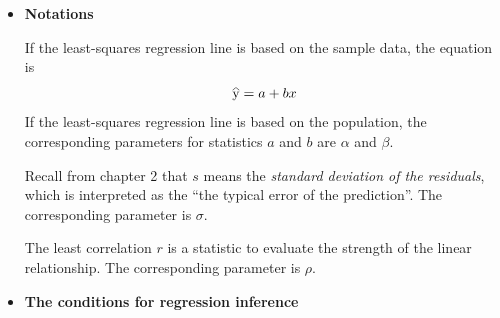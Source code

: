 \documentclass[a4paper, 12pt,twoside]{book}
\newcommand\reallywidehat[1]{%
\savestack{\tmpbox}{\stretchto{%
  \scaleto{%
    \scalerel*[\widthof{\ensuremath{#1}}]{\kern-.6pt\bigwedge\kern-.6pt}%
    {\rule[-\textheight/2]{1ex}{\textheight}}%
  }{\textheight}%
}{0.5ex}}%
\stackon[1pt]{#1}{\tmpbox}%
}
\begin{document}
\begin{itemize}
   \item \textbf{Notations}\vspace{0.3cm}
   
   If the least-squares regression line is based on the sample data, the equation is 
   $$\reallywidehat{y} = a + bx$$
   If the least-squares regression line is based on the population, the corresponding parameters for statistics $a$ and $b$ are $\alpha$ and $\beta$.\vspace{0.3cm}
  
  Recall from chapter 2 that $s$ means the \textit{standard deviation of the residuals}, which is interpreted as the ``the typical error of the prediction''. The corresponding parameter is $\sigma$. \vspace{0.3cm}
  
  The least correlation $r$ is a statistic to evaluate the strength of the linear relationship. The corresponding parameter is $\rho$.\vspace{0.3cm}
  
  \item \textbf{The conditions for regression inference}\vspace{0.3cm}
  

\end{itemize}
\end{document}
